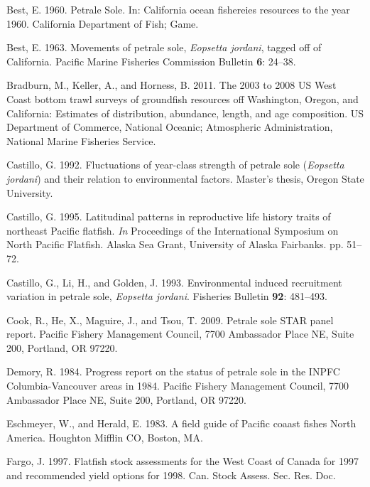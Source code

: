 \documentclass[12pt,]{article}
\begin{document}
\hypertarget{ref-best_petrale_1960}{}
Best, E. 1960. Petrale Sole. In: California ocean fishereies resources
to the year 1960. California Department of Fish; Game.

\hypertarget{ref-best_e.a._movements_1963}{}
Best, E. 1963. Movements of petrale sole, \emph{Eopsetta jordani},
tagged off of California. Pacific Marine Fisheries Commission Bulletin
\textbf{6}: 24--38.

\hypertarget{ref-bradburn_2003_2011}{}
Bradburn, M., Keller, A., and Horness, B. 2011. The 2003 to 2008 US West
Coast bottom trawl surveys of groundfish resources off Washington,
Oregon, and California: Estimates of distribution, abundance, length,
and age composition. US Department of Commerce, National Oceanic;
Atmospheric Administration, National Marine Fisheries Service.

\hypertarget{ref-castillo_g.c._fluctuations_1992}{}
Castillo, G. 1992. Fluctuations of year-class strength of petrale sole
(\emph{Eopsetta jordani}) and their relation to environmental factors.
Master's thesis, Oregon State University.

\hypertarget{ref-castillo_latitudinal_1995}{}
Castillo, G. 1995. Latitudinal patterns in reproductive life history
traits of northeast Pacific flatfish. \emph{In} Proceedings of the
International Symposium on North Pacific Flatfish. Alaska Sea Grant,
University of Alaska Fairbanks. pp. 51--72.

\hypertarget{ref-castillo_g.c._environmental_1993}{}
Castillo, G., Li, H., and Golden, J. 1993. Environmental induced
recruitment variation in petrale sole, \emph{Eopsetta jordani}.
Fisheries Bulletin \textbf{92}: 481--493.

\hypertarget{ref-cook_petrale_2009}{}
Cook, R., He, X., Maguire, J., and Tsou, T. 2009. Petrale sole STAR
panel report. Pacific Fishery Management Council, 7700 Ambassador Place
NE, Suite 200, Portland, OR 97220.

\hypertarget{ref-demory_progress_1984}{}
Demory, R. 1984. Progress report on the status of petrale sole in the
INPFC Columbia-Vancouver areas in 1984. Pacific Fishery Management
Council, 7700 Ambassador Place NE, Suite 200, Portland, OR 97220.

\hypertarget{ref-eschmeyer_field_1983}{}
Eschmeyer, W., and Herald, E. 1983. A field guide of Pacific coaast
fishes North America. Houghton Mifflin CO, Boston, MA.

\hypertarget{ref-fargo_j.j._flatfish_1997}{}
Fargo, J. 1997. Flatfish stock assessments for the West Coast of Canada
for 1997 and recommended yield options for 1998. Can. Stock Assess. Sec.
Res. Doc.
\end{document}
